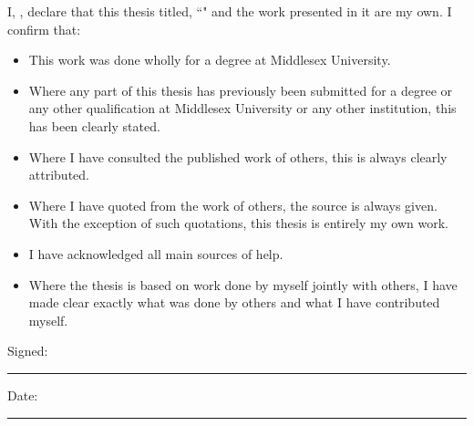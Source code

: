 \noindent I, \authorName, declare that this thesis titled, ``\thesisTitle" and the work presented in it are my own. I confirm that:

\begin{itemize} 
\item This work was done wholly for a degree at Middlesex University.
\item Where any part of this thesis has previously been submitted for a degree or any other qualification at Middlesex University or any other institution, this has been clearly stated.
\item Where I have consulted the published work of others, this is always clearly attributed.
\item Where I have quoted from the work of others, the source is always given. With the exception of such quotations, this thesis is entirely my own work.
\item I have acknowledged all main sources of help.
\item Where the thesis is based on work done by myself jointly with others, I have made clear exactly what was done by others and what I have contributed myself.\\
\end{itemize}
 
\noindent Signed:\\
\rule[0.5em]{25em}{0.5pt} %
 
\noindent Date:\\
\rule[0.5em]{25em}{0.5pt} %
\
